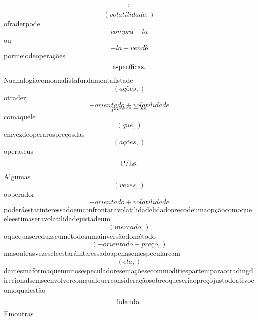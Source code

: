 \documentclass{article}
\begin{document}
\begin{equation}
$:$
\end{equation}\begin{equation}
\left( volatilidade,\right)
\end{equation}ofraderpode\begin{equation}
comprá - la
\end{equation}ou\begin{equation}
- la + vendê
\end{equation}pormeiodeoperações\begin{equation}
$específicas.$
\end{equation}Naanalogiacomoanalistafundamentalistade\begin{equation}
\left( ações,\right)
\end{equation}otrader\begin{equation}
- orientado + volatilidade
\end{equation}\begin{equation}
parece - se
\end{equation}comaquele\begin{equation}
\left( que,\right)
\end{equation}emvezdeoperarospreçosdas\begin{equation}
\left( ações,\right)
\end{equation}operaseus\begin{equation}
$P/Ls.$
\end{equation}Algumas\begin{equation}
\left( vezes,\right)
\end{equation}ooperador\begin{equation}
- orientado + volatilidade
\end{equation}poderáestarinteressadoemconfrontaravolatilidadelidadopreçodeumaopçãocomoqueeleestimaseravolatilidadejustadeum\begin{equation}
\left( mercado,\right)
\end{equation}oquequasereduzseumétodoaumainversãodométodo\begin{equation}
\left( - orientado + preço,\right)
\end{equation}masoutrasvezeseleestaráinteressadoapenasemespecularcom\begin{equation}
\left( ela,\right)
\end{equation}damesmaformaquemuitosespeculadoresemaçõesecommoditiespartemparaotradingdirecionalsemseenvolvercomqualquerconsideraçãosobreoqueseriaopreçojustodoativocomoqualestão\begin{equation}
$lidando.$
\end{equation}Emoutras\begin{equation}

\end{equation}
\end{document}
